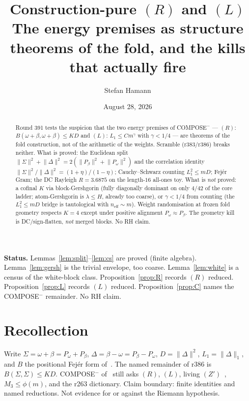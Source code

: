 \documentclass[11pt]{article}
\title{\bfseries Construction-pure $(R)$ and $(L)$\\[2mm]
\large The energy premises as structure theorems of the fold,
and the kills that actually fire}
\author{Stefan Hamann}
\date{August 28, 2026}
\theoremstyle{remark}
\begin{document}
\maketitle

\begin{abstract}\noindent
Round 391 tests the suspicion that the two energy premises of
COMPOSE$^-$ --- $(R)$: $B(\omega+\beta,\omega+\beta)\le K D$ and
$(L)$: $L_1\le C m^\gamma$ with $\gamma<1/4$ --- are theorems of
the fold construction, not of the arithmetic of the weights.
Scramble (r383/r386) breaks neither.  What is proved: the
Euclidean split
$\lVert\Sigma\rVert^2+\lVert\Delta\rVert^2=2(\lVert P_\beta\rVert^2+\lVert P_\omega\rVert^2)$
and the correlation identity
$\lVert\Sigma\rVert^2/\lVert\Delta\rVert^2=(1+\eta)/(1-\eta)$;
Cauchy--Schwarz counting $L_1^2\le m D$; Fej\'er Gram; the DC
Rayleigh $R=3.6875$ on the length-$16$ all-ones toy.
What is \emph{not} proved: a cofinal $K$ via block-Gershgorin
(fully diagonally dominant on only $4/42$ of the core ladder;
atom-Gershgorin is $\lambda\le H$, already too coarse), or
$\gamma<1/4$ from counting (the $L_1^2\le m D$ bridge is
tautological with $n_{\mathrm{eff}}\sim m$).
Weight randomisation at frozen fold geometry respects $K=4$
except under positive alignment $P_\omega\approx P_\beta$.
The geometry kill is DC/sign-flatten, \emph{not} merged blocks.
No RH claim.
\end{abstract}

\medskip\noindent
\textbf{Status.}\enspace
Lemmas~\ref{lem:split}--\ref{lem:cs} are proved (finite algebra).
Lemma~\ref{lem:gersh} is the trivial envelope, too coarse.
Lemma~\ref{lem:white} is a census of the white-block class.
Proposition~\ref{prop:R} records $(R)$ reduced.
Proposition~\ref{prop:L} records $(L)$ reduced.
Proposition~\ref{prop:C} names the COMPOSE$^-$ remainder.
No RH claim.

\section{Recollection}\label{sec:rec}

Write $\Sigma=\omega+\beta=P_\omega+P_\beta$,
$\Delta=\beta-\omega=P_\beta-P_\omega$, $D=\lVert\Delta\rVert^2$,
$L_1=\lVert\Delta\rVert_1$, and $B$ the positional Fej\'er form
of~\cite{r378,r386}.  The named remainder of r386 is
$B(\Sigma,\Sigma)\le K D$.  COMPOSE$^-$ of~\cite{r378} still
asks $(R)$, $(L)$, living $(Z')$~\cite{r386}, $M_3\le\phi(m)$,
and the r263 dictionary.  Claim boundary: finite identities
and named reductions.  Not evidence for or against the
Riemann hypothesis.
\end{document}
